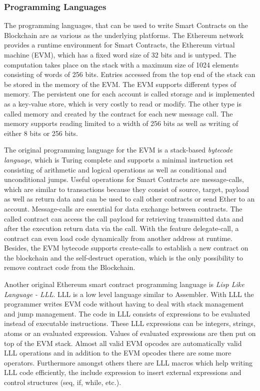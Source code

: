 \documentclass[conference]{IEEEtran}
\begin{document}
\subsubsection{Programming Languages}
The programming languages, that can be used to write Smart Contracts on the Blockchain are as various as the underlying platforms. The Ethereum network provides a runtime environment for Smart Contracts, the Ethereum virtual machine (EVM), which has a fixed word size of 32 bits and is untyped. The computation takes place on the stack with a maximum size of 1024 elements consisting of words of 256 bits. Entries accessed from the top end of the stack can be stored in the memory of the EVM. The EVM supports different types of memory. The persistent one for each account is called storage and is implemented as a key-value store, which is very costly to read or modify. The other type is called memory and created by the contract for each new message call. The memory supports reading limited to a width of 256 bits as well as writing of either 8 bits or 256 bits. \cite{Solidity2017} \par 
The original programming language for the EVM is a stack-based \textit{bytecode language}, which is Turing complete and supports a minimal instruction set consisting of arithmetic and logical operations as well as conditional and unconditional jumps. Useful operations for Smart Contracts are message-calls, which are similar to transactions because they consist of source, target, payload as well as return data and can be used to call other contracts or send Ether to an account. Message-calls are essential for data exchange between contracts. The called contract can access the call payload for retrieving transmitted data and after the execution return data via the call. With the feature delegate-call, a contract can even load code dynamically from another address at runtime. Besides, the EVM bytecode supports create-calls to establish a new contract on the blockchain and the self-destruct operation, which is the only possibility to remove contract code from the Blockchain. \cite{Bartoletti2017} \cite{McAdams2017} \cite{Solidity2017}\par 
Another original Ethereum smart contract programming language is \textit{Lisp Like Language - LLL}. LLL is a low level language similar to Assembler. With LLL the programmer writes EVM code without having to deal with stack management and jump management. The code in LLL consists of expressions to be evaluated instead of executable instructions. These LLL expressions can be integers, strings, atoms or an evaluated expression. Values of evaluated expressions are then put on top of the EVM stack. Almost all valid EVM opcodes are automatically valid LLL operations and in addition to the EVM opcodes there are some more operators. Furthermore amongst others there are LLL macros which help writing LLL code efficiently, the include expression to insert external expressions and control structures (seq, if, while, etc.). \cite{Edgington2017} \par 
\end{document}
